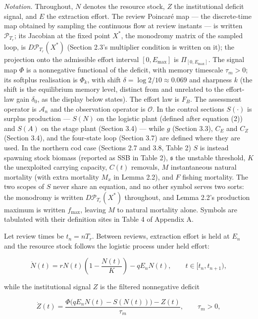 \documentclass[11pt]{article}
\begin{document}
\emph{Notation.} Throughout, \(N\) denotes the resource stock, \(Z\) the
institutional deficit signal, and \(E\) the extraction effort. The
review Poincar\'e map --- the discrete-time map obtained by sampling the
continuous flow at review instants --- is written \(\mathcal P_{T_r}\);
its Jacobian at the fixed point \(X^*\), the monodromy matrix of the
sampled loop, is \(D\mathcal P_{T_r}(X^*)\) (Section 2.3's multiplier
condition is written on it); the projection onto the admissible effort
interval \([0,E_{\max}]\) is \(\Pi_{[0,E_{\max}]}\). The signal map
\(\Phi\) is a nonnegative functional of the deficit, with memory
timescale \(\tau_m>0\); its softplus realisation is \(\Phi_k\), with
shift \(\delta = \log 2/10 \approx 0.069\) and sharpness \(k\) (the shift is the equilibrium memory level, distinct from and unrelated to the effort-law
gain \(\delta_0\), as the display below states). The effort law is
\(F_B\). The assessment operator is \(\mathcal A_n\) and the observation
operator is \(\mathcal O\). In the control sections \(S(\cdot)\) is
surplus production --- \(S(N)\) on the logistic plant (defined after equation (2)) and
\(S(A)\) on the stage plant (Section 3.4) --- while \(g\) (Section 3.3),
\(C_E\) and \(C_Z\) (Section 3.4), and the four-state loop (Section 3.7)
are defined where they are used. In the northern cod case (Sections 2.7
and 3.8, Table 2) \(S\) is instead spawning stock biomass (reported as
SSB in Table 2), \(\mathfrak s\) the unstable threshold, \(K\) the
unexploited carrying capacity, \(C(t)\) removals, \(M\) instantaneous
natural mortality (with extra mortality \(M_x\) in Lemma 2.2), and \(F\)
fishing mortality. The two scopes of \(S\) never share an equation, and
no other symbol serves two sorts: the monodromy is written
\(D\mathcal P_{T_r}(X^*)\) throughout, and Lemma 2.2's production
maximum is written \(f_{\max}\), leaving \(M\) to natural mortality
alone. Symbols are tabulated with their definition sites in Table 4 of
Appendix A.

Let review times be \(t_n=nT_r\). Between reviews, extraction effort is
held at \(E_n\) and the resource stock follows the logistic process
under held effort:

\[
\dot N(t)=rN(t)\left(1-\frac{N(t)}{K}\right)-qE_nN(t),\qquad t\in[t_n,t_{n+1}),
\tag{1}
\]

while the institutional signal \(Z\) is the filtered nonnegative deficit

\[
\dot Z(t)=\frac{\Phi\bigl(qE_nN(t)-S(N(t))\bigr)-Z(t)}{\tau_m},\qquad \tau_m>0,
\tag{2}
\]
\end{document}
